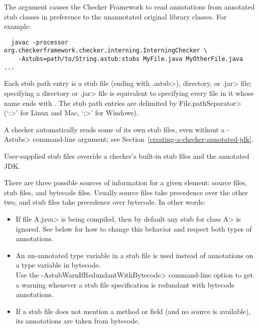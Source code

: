 
The  argument causes the Checker Framework to read
annotations from annotated stub classes in preference to the unannotated
original library classes.  For example:

\begin{myxsmall}
\begin{Verbatim}
  javac -processor org.checkerframework.checker.interning.InterningChecker \
    -Astubs=path/to/String.astub:stubs MyFile.java MyOtherFile.java ...
\end{Verbatim}
\end{myxsmall}

Each stub path entry is a stub file (ending with \<.astub>), directory, or
\<.jar> file; specifying a directory or \<.jar> file is
equivalent to specifying every file in it whose name ends with
.  The stub path entries are delimited by
\<File.pathSeparator> (`\<:>' for Linux and Mac, `\<;>' for Windows).

A checker automatically reads some of its own stub files, even without a
\<-Astubs> command-line argument; see
Section~\ref{creating-a-checker-annotated-jdk}.

User-supplied stub files override a checker's built-in stub files and the
annotated JDK\@.



There are three possible sources of information for a given
element: source files, stub files, and bytecode files.
Usually source files take precedence over the other two,
and stub files take precedence over bytecode.
In other words:
\begin{itemize}
\item
  If file \<A.java> is being compiled, then by default any stub for class
  \<A> is ignored.  See below for how to change this behavior and respect
  both types of annotations.
\item
  An un-annotated type variable in a stub file is used instead of
  annotations on a type variable in bytecode.
  \\
  Use the \<-AstubWarnIfRedundantWithBytecode> command-line option to get a
  warning whenever a stub file specification is redundant with bytecode
  annotations.
\item
  If a stub file does not mention a method or field (and no source is
  available), its annotations are taken from bytecode.
\end{itemize}

